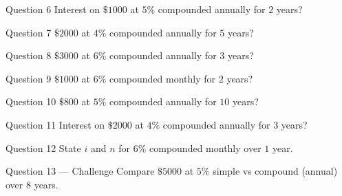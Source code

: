 \documentclass[11pt]{article}
\begin{document}
\begin{qbox}{Question 6}
Interest on $\$1000$ at $5\%$ compounded annually for $2$ years?\workspace{2.4cm}
\end{qbox}

\begin{qbox}{Question 7}
$\$2000$ at $4\%$ compounded annually for $5$ years?\workspace{2.4cm}
\end{qbox}

\begin{qbox}{Question 8}
$\$3000$ at $6\%$ compounded annually for $3$ years?\workspace{2.4cm}
\end{qbox}

\begin{qbox}{Question 9}
$\$1000$ at $6\%$ compounded monthly for $2$ years?\workspace{2.4cm}
\end{qbox}

\begin{qbox}{Question 10}
$\$800$ at $5\%$ compounded annually for $10$ years?\workspace{2.4cm}
\end{qbox}

\begin{qbox}{Question 11}
Interest on $\$2000$ at $4\%$ compounded annually for $3$ years?\workspace{2.4cm}
\end{qbox}

\begin{qbox}{Question 12}
State $i$ and $n$ for $6\%$ compounded monthly over $1$ year.\workspace{2.4cm}
\end{qbox}

\begin{qbox}{Question 13 --- Challenge}
Compare $\$5000$ at $5\%$ simple vs compound (annual) over $8$ years.\workspace{3.5cm}
\end{qbox}

\clearpage
{}
\end{document}
